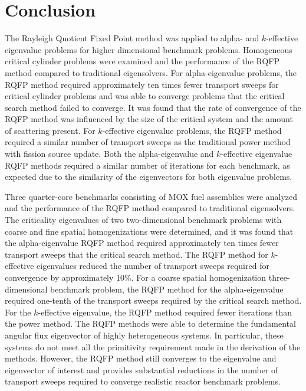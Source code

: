 
\clearpage

\section{Conclusion}

The Rayleigh Quotient Fixed Point method was applied to alpha- and $k$-effective eigenvalue problems for higher dimensional benchmark problems. Homogeneous critical cylinder problems were examined and the performance of the RQFP method compared to traditional eigensolvers. For alpha-eigenvalue problems, the RQFP method required approximately ten times fewer transport sweeps for critical cylinder problems and was able to converge problems that the critical search method failed to converge. It was found that the rate of convergence of the RQFP method was influenced by the size of the critical system and the amount of scattering present. For $k$-effective eigenvalue problems, the RQFP method required a similar number of transport sweeps as the traditional power method with fission source update. Both the alpha-eigenvalue and $k$-effective eigenvalue RQFP methods required a similar number of iterations for each benchmark, as expected due to the similarity of the eigenvectors for both eigenvalue problems.

Three quarter-core benchmarks consisting of MOX fuel assemblies were analyzed and the performance of the RQFP method compared to traditional eigensolvers. The criticality eigenvalues of two two-dimensional benchmark problems with coarse and fine spatial homogenizations were determined, and it was found that the alpha-eigenvalue RQFP method required approximately ten times fewer transport sweeps that the critical search method. The RQFP method for $k$-effective eigenvalues reduced the number of transport sweeps required for convergence by approximately 10\%. For a coarse spatial homogenization three-dimensional benchmark problem, the RQFP method for the alpha-eigenvalue required one-tenth of the transport sweeps required by the critical search method. For the $k$-effective eigenvalue, the RQFP method required fewer iterations than the power method. The RQFP methods were able to determine the fundamental angular flux eigenvector of highly heterogeneous systems. In particular, these systems do not meet all the primitivity requirement made in the derivation of the methods. However, the RQFP method still converges to the eigenvalue and eigenvector of interest and provides substantial reductions in the number of transport sweeps required to converge realistic reactor benchmark problems.

